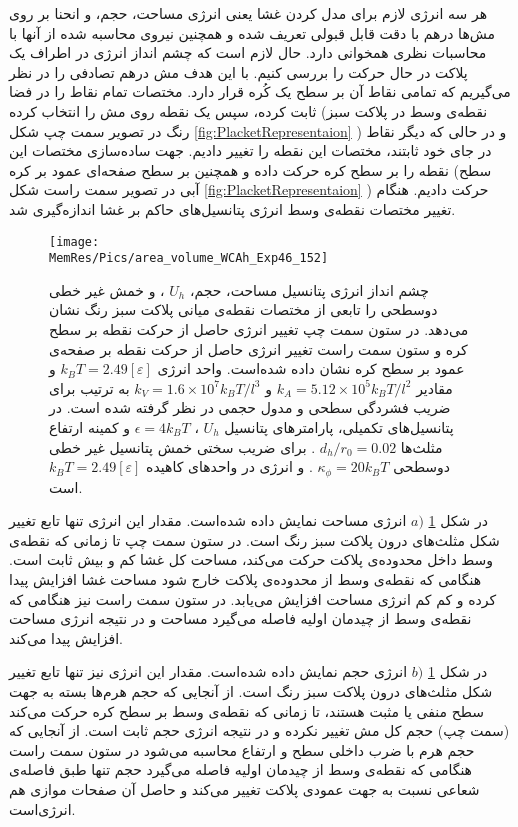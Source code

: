 هر سه انرژی لازم برای مدل کردن غشا یعنی انرژی مساحت، حجم، و انحنا بر روی مش‌ها درهم با دقت قابل قبولی تعریف شده و همچنین نیروی محاسبه شده از آنها با محاسبات نظری همخوانی دارد. حال لازم است که چشم انداز انرژی در اطراف یک پلاکت در حال حرکت را بررسی کنیم. با این هدف مش درهم تصادفی را در نظر می‌گیریم که تمامی نقاط آن بر سطح یک کُره‌ قرار دارد. مختصات تمام نقاط را در فضا ثابت کرده، سپس یک نقطه روی مش را انتخاب کرده (نقطه‌ی وسط در پلاکت سبز رنگ در تصویر سمت چپ شکل
\ref{fig:PlacketRepresentaion}
) و در حالی که دیگر نقاط در جای خود ثابتند، مختصات این نقطه را تغییر دادیم. جهت ساده‌سازی مختصات این نقطه را  بر سطح کره‌ حرکت داده و همچنین بر سطح صفحه‌ای عمود بر کره (سطح آبی در تصویر سمت راست شکل
\ref{fig:PlacketRepresentaion}
) حرکت دادیم. هنگام تغییر مختصات نقطه‌ی وسط انرژی پتانسیل‌های حاکم بر غشا اندازه‌گیری شد. 




\begin{figure}[htbp]
\begin{center}
\texttt{[image: \\MemRes/Pics/area\_volume\_WCAh\_Exp46\_152]}
\caption{
چشم انداز انرژی پتانسیل مساحت، حجم،
$U_h$
، و خمش غیر خطی دوسطحی را تابعی از مختصات نقطه‌ی میانی پلاکت سبز رنگ نشان می‌دهد. در ستون سمت چپ تغییر انرژی حاصل از حرکت نقطه بر سطح کره و ستون سمت راست تغییر انرژی حاصل از حرکت نقطه بر صفحه‌ی عمود بر سطح کره  نشان داده شده‌است. واحد انرژی
$k_BT=2.49[\varepsilon]$
 و مقادیر 
 $k_A=5.12\times10^5k_BT/l^2$
 و
 $k_V=1.6\times10^7k_BT/l^3$
 به ترتیب برای ضریب فشردگی سطحی و مدول حجمی در نظر گرفته شده است. در پتانسیل‌های تکمیلی، پارامتر‌های پتانسیل 
 $U_h$
 ، 
$\epsilon=4k_BT$
 و کمینه ارتفاع مثلث‌ها 
 $d_h/r_0=0.02$ 
 . برای ضریب سختی خمش پتانسیل غیر خطی دوسطحی 
 $\kappa_{\phi}=20k_BT$
 . و انرژی در واحد‌های کاهیده
 $k_BT=2.49[\varepsilon]$
 است.
}
\label{fig:PlacketEnergyArea}
\end{center}
\end{figure}

در شکل 
\ref{fig:PlacketEnergyArea} $a)$
 انرژی مساحت نمایش داده شده‌است. مقدار این انرژی تنها تابع تغییر شکل مثلث‌های درون پلاکت سبز رنگ است. در ستون سمت چپ تا زمانی که نقطه‌ی وسط داخل محدوده‌ی پلاکت حرکت می‌کند، مساحت کل غشا کم و بیش ثابت است. هنگامی‌ که نقطه‌ی وسط از محدوده‌ی پلاکت خارج شود مساحت غشا افزایش پیدا کرده و کم کم انرژی مساحت افزایش می‌یابد. در ستون سمت راست نیز هنگامی که نقطه‌ی وسط از چیدمان اولیه فاصله می‌گیرد مساحت و در نتیجه انرژی مساحت افزایش پیدا می‌کند. 

در شکل 
\ref{fig:PlacketEnergyArea} $b)$
 انرژی حجم نمایش داده شده‌است. مقدار این انرژی نیز تنها تابع تغییر شکل مثلث‌های درون پلاکت سبز رنگ است. از آنجایی که حجم هرم‌ها بسته به جهت سطح منفی یا مثبت هستند، تا زمانی که نقطه‌ی وسط بر سطح کره حرکت می‌کند (سمت چپ) حجم کل مش تغییر نکرده و در نتیجه انرژی حجم ثابت است.‌ از آنجایی که حجم هرم با ضرب داخلی سطح و ارتفاع محاسبه می‌شود در ستون سمت راست  هنگامی که نقطه‌ی وسط از چیدمان اولیه فاصله می‌گیرد حجم تنها طبق فاصله‌ی شعاعی نسبت به جهت عمودی پلاکت تغییر می‌کند و حاصل آن صفحات موازی هم انرژی‌است.

